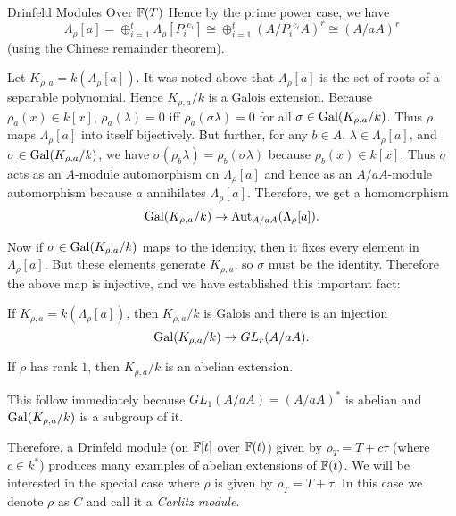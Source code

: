 \documentclass[12pt]{article}
\begin{document}
\begin{section}{Drinfeld Modules Over ${\mathbb F}(T)$}
Hence by the prime power case, we have
$$\Lambda_\rho[a] = \oplus^t_{i=1} \Lambda_\rho[{P_i}^{e_i}]
\cong \oplus^t_{i=1} (A/{P_i}^{e_i}A)^r \cong (A/aA)^r$$
(using the Chinese remainder theorem).
\hamlos

Let $K_{\rho,a} = k(\Lambda_\rho[a])$.  It was noted above that
$\Lambda_\rho[a]$ is the set of roots of a separable polynomial.  Hence
$K_{\rho,a}/k$ is a Galois extension.  Because $\rho_a(x) \in k[x]$,
$\rho_a(\lambda) = 0$ iff $\rho_a(\sigma\lambda) = 0$ for all
$\sigma \in \operatorname{Gal}(K_{\rho,a}/k)$.  Thus $\rho$ maps $\Lambda_\rho[a]$ into
itself bijectively.  But further, for any $b \in A$,
$\lambda \in \Lambda_\rho[a]$, and $\sigma \in \operatorname{Gal}(K_{\rho,a}/k)$, we
have $\sigma(\rho_b\lambda) = \rho_b(\sigma\lambda)$ because
$\rho_b(x) \in k[x]$.  Thus $\sigma$ acts as an $A$-module automorphism on
$\Lambda_\rho[a]$ and hence as an $A/aA$-module automorphism because $a$
annihilates $\Lambda_\rho[a]$.  Therefore, we get a homomorphism
$$\operatorname{Gal}(K_{\rho,a}/k) \rightarrow \operatorname{Aut}_{A/aA}(\Lambda_\rho[a]).$$

Now if $\sigma \in \operatorname{Gal}(K_{\rho,a}/k)$ maps to the identity, then it fixes
every element in $\Lambda_\rho[a]$.  But these elements generate
$K_{\rho,a}$, so $\sigma$ must be the identity.  Therefore the above map
is injective, and we have established this important fact:
\begin{proposition}
If $K_{\rho,a} = k(\Lambda_\rho[a])$, then $K_{\rho,a}/k$ is Galois and
there is an injection
$$\operatorname{Gal}(K_{\rho,a}/k) \rightarrow GL_r(A/aA).$$
\end{proposition}

\begin{corollary}
If $\rho$ has rank $1$, then $K_{\rho,a}/k$ is an abelian extension.
\end{corollary}

\pf
This follow immediately because $GL_1(A/aA) = (A/aA)^*$ is abelian and
$\operatorname{Gal}(K_{\rho,a}/k)$ is a subgroup of it.
\hamlos

Therefore, a Drinfeld module (on ${\mathbb F}[t]$ over ${\mathbb F}(t)$) given by $\rho_T =
T + c\tau$ (where $c \in k^*$) produces many examples of abelian
extensions of ${\mathbb F}(t)$.  We will be interested in the special case where
$\rho$ is given by $\rho_T = T + \tau$.  In this case we denote $\rho$ as
$C$ and call it a \emph{Carlitz module}.

\end{section} %
\end{document}
